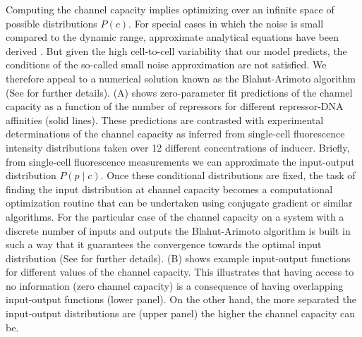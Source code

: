 Computing the channel capacity implies optimizing over an infinite space of
possible distributions $P(c)$. For special cases in which the noise is small
compared to the dynamic range, approximate analytical equations have been
derived \cite{Tkacik2008a}. But given the high cell-to-cell variability that
our model predicts, the conditions of the so-called small noise approximation
are not satisfied. We therefore appeal to a numerical solution known as the
Blahut-Arimoto algorithm \cite{Blahut1972} (See  for
further details). (A) shows zero-parameter fit predictions
of the channel capacity as a function of the number of repressors for different
repressor-DNA affinities (solid lines). These predictions are contrasted with
experimental determinations of the channel capacity as inferred from
single-cell fluorescence intensity distributions taken over 12 different
concentrations of inducer. Briefly, from single-cell fluorescence measurements
we can approximate the input-output distribution $P(p \mid c)$. Once these
conditional distributions are fixed, the task of finding the input distribution
at channel capacity becomes a computational optimization routine that can be
undertaken using conjugate gradient or similar algorithms. For the particular
case of the channel capacity on a system with a discrete number of inputs and
outputs the Blahut-Arimoto algorithm is built in such a way that it guarantees
the convergence towards the optimal input distribution (See
 for further details). (B) shows
example input-output functions for different values of the channel capacity.
This illustrates that having access to no information (zero channel capacity)
is a consequence of having overlapping input-output functions (lower panel). On
the other hand, the more separated the input-output distributions are (upper
panel) the higher the channel capacity can be.

